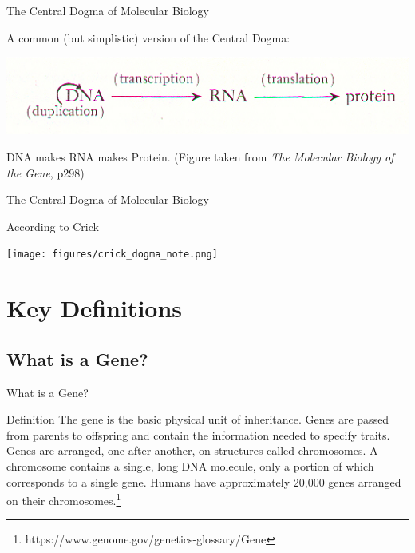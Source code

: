 \documentclass[11pt]{beamer}
\begin{document}
\begin{frame}{The Central Dogma of Molecular Biology}

	A common (but simplistic) version of the Central Dogma:
	
	\vspace{3mm}	
	
	\begin{center}
	\includegraphics[scale=1]{figures/Watson_Central_Dogma.jpg} 	
	\end{center}
	
	\vspace{3mm}	
	
	\begin{block}{}
	DNA makes RNA makes Protein.
	(Figure taken from \textit{The Molecular Biology of the Gene}, p298)
	\end{block}
	
	
\end{frame}

\begin{frame}{The Central Dogma of Molecular Biology}

	According to Crick 

	\begin{center}
	\texttt{[image: figures/crick\_dogma\_note.png]}
	\end{center}
	

\end{frame}

\section{Key Definitions}

\subsection{What is a Gene?}

\begin{frame}{What is a Gene?}

	\begin{block}{Definition}
		The gene is the basic physical unit of inheritance. 
		Genes are passed from parents to offspring and contain the information needed to specify traits. 
		Genes are arranged, one after another, on structures called chromosomes. 
		A chromosome contains a single, long DNA molecule, only a portion of which corresponds to a single gene. 
		Humans have approximately 20,000 genes arranged on their chromosomes.\footnote{https://www.genome.gov/genetics-glossary/Gene}
	\end{block}
	
\end{frame}
\end{document}

